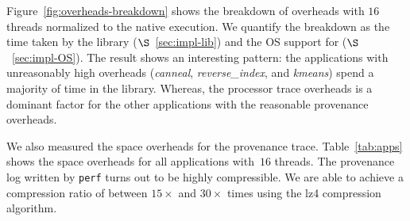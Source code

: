  Figure~\ref{fig:overheads-breakdown} shows the breakdown of overheads with $16$ threads normalized to the native \pthreads execution. We quantify the breakdown as the time taken by the \projecttitle library ($\S$~\ref{sec:impl-lib}) and the OS support for \intelpt  ($\S$~\ref{sec:impl-OS}). The result shows an interesting pattern: the applications with unreasonably high overheads ({\em canneal}, {\em reverse\_index}, and {\em kmeans}) spend a majority of time in the \projecttitle library. Whereas, the processor trace overheads is a dominant factor for the other applications with the reasonable provenance overheads.





 We also measured the space overheads for the provenance trace. Table~\ref{tab:apps} shows the space overheads for all applications with~$16$ threads. The provenance log written by {\tt perf} turns out to be highly compressible. We
are able to achieve a compression ratio of between $15\times$ and $30\times$ times using the lz4 compression algorithm.

